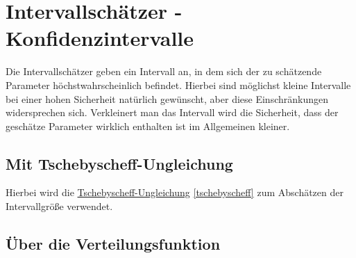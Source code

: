 \section{Intervallschätzer - Konfidenzintervalle}
Die Intervallschätzer geben ein Intervall an, in dem sich der zu schätzende Parameter höchstwahrscheinlich befindet. Hierbei sind möglichst kleine Intervalle bei einer hohen Sicherheit natürlich gewünscht, aber diese Einschränkungen widersprechen sich. 
Verkleinert man das Intervall wird die Sicherheit, dass der geschätze Parameter wirklich enthalten ist im Allgemeinen kleiner.


\subsection{Mit Tschebyscheff-Ungleichung}
Hierbei wird die \hyperref[tschebyscheff]{Tschebyscheff-Ungleichung} \autoref{tschebyscheff} zum Abschätzen der Intervallgröße verwendet.
\subsection{Über die Verteilungsfunktion}


